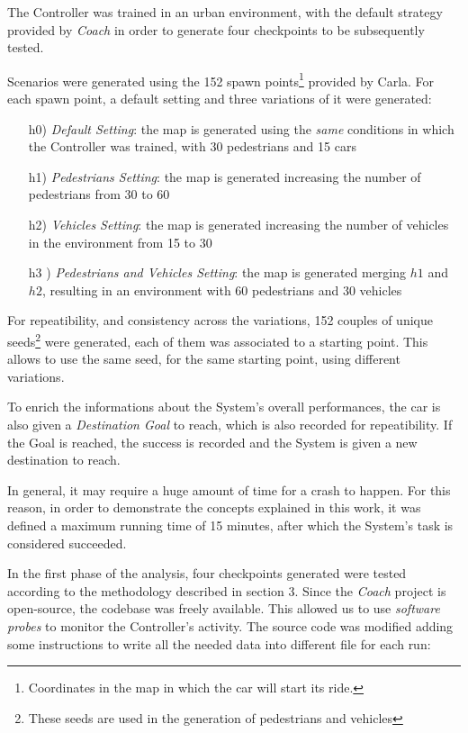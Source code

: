 The Controller was trained in an urban environment, with the default strategy provided by \textsl{Coach} in order to generate four checkpoints to be subsequently tested.

Scenarios were generated using the 152 spawn points\footnote{Coordinates in the map in which the car will start its ride.} provided by Carla.
For each spawn point, a default setting and three variations of it were generated:

\begin{itemize}
	\item[h0)] \textsl{Default Setting}: the map is generated using the \textsl{same} conditions in which the Controller was trained, with 30 pedestrians and 15 cars
	\item[h1)] \textsl{Pedestrians Setting}: the map is generated increasing the number of pedestrians from 30 to 60
	\item[h2)] \textsl{Vehicles Setting}: the map is generated increasing the number of vehicles in the environment from 15 to 30
	\item[h3]) \textsl{Pedestrians and Vehicles Setting}: the map is generated merging $h1$ and $h2$, resulting in an environment with 60 pedestrians and 30 vehicles
\end{itemize}
	
For repeatibility, and consistency across the variations, 152 couples of unique seeds\footnote{These seeds are used in the generation of pedestrians and vehicles} were generated, each of them was associated to a starting point. This allows to use the same seed, for the same starting point, using different variations.

To enrich the informations about the System's overall performances, the car is also given a \textsl{Destination Goal} to reach, which is also recorded for repeatibility. If the Goal is reached, the success is recorded and the System is given a new destination to reach.\newline

In general, it may require a huge amount of time for a crash to happen. For this reason, in order to demonstrate the concepts explained in this work, it was defined a maximum running time of 15 minutes, after which the System's task is considered succeeded.

In the first phase of the analysis, four checkpoints generated were tested according to the methodology described in section 3.
Since the \textsl{Coach} project is open-source, the codebase was freely available. This allowed us to use \textsl{software probes} to monitor the Controller's activity.
The source code was modified adding some instructions to write all the needed data into different file for each run:

